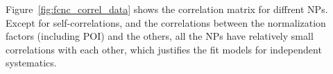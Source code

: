 
Figure~\ref{fig:fcnc_correl_data} shows the correlation matrix for diffrent NPs. Except for self-correlations, and the correlations between the normalization factors (including POI) and the others, all the NPs have relatively small correlations with each other, which justifies the fit models for independent systematics. %


%

%



